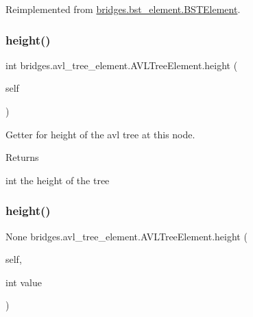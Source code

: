 Reimplemented from \mbox{\hyperlink{classbridges_1_1bst__element_1_1_b_s_t_element_a9d038f191a7cf06e75910463a3aa3b80}{bridges.\+bst\+\_\+element.\+B\+S\+T\+Element}}.

\mbox{\label{classbridges_1_1avl__tree__element_1_1_a_v_l_tree_element_af32b7f1985abf0f6c0573cc23fef63b6}} 
\subsubsection{\texorpdfstring{height()}{height()}\hspace{0.1cm}{\footnotesize\ttfamily [1/2]}}
{\footnotesize\ttfamily  int bridges.\+avl\+\_\+tree\+\_\+element.\+A\+V\+L\+Tree\+Element.\+height (\begin{DoxyParamCaption}\item[{}]{self }\end{DoxyParamCaption})}



Getter for height of the avl tree at this node. 

\begin{DoxyReturn}{Returns}


int the height of the tree 
\end{DoxyReturn}
\mbox{\label{classbridges_1_1avl__tree__element_1_1_a_v_l_tree_element_acc82ab37af6763d759493fd708218702}} 
\subsubsection{\texorpdfstring{height()}{height()}\hspace{0.1cm}{\footnotesize\ttfamily [2/2]}}
{\footnotesize\ttfamily  None bridges.\+avl\+\_\+tree\+\_\+element.\+A\+V\+L\+Tree\+Element.\+height (\begin{DoxyParamCaption}\item[{}]{self,  }\item[{int}]{value }\end{DoxyParamCaption})}



